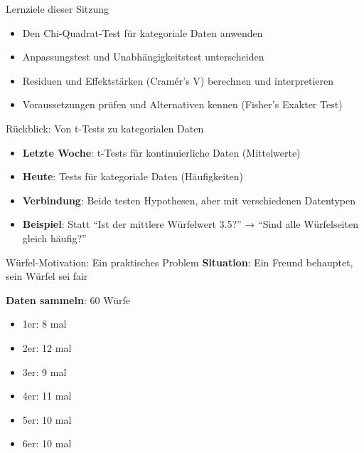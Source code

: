 \documentclass[
  ignorenonframetext,
]{beamer}
\providecommand{\tightlist}{%
  \setlength{\itemsep}{0pt}\setlength{\parskip}{0pt}}
\begin{document}
\begin{frame}{Lernziele dieser Sitzung}
\protect{}\label{lernziele-dieser-sitzung-6}
\begin{itemize}
\tightlist
\item
  Den Chi-Quadrat-Test für kategoriale Daten anwenden
\item
  Anpassungstest und Unabhängigkeitstest unterscheiden
\item
  Residuen und Effektstärken (Cramér's V) berechnen und interpretieren
\item
  Voraussetzungen prüfen und Alternativen kennen (Fisher's Exakter Test)
\end{itemize}
\end{frame}

\begin{frame}{Rückblick: Von t-Tests zu kategorialen Daten}
\protect{}\label{ruxfcckblick-von-t-tests-zu-kategorialen-daten}
\begin{itemize}
\tightlist
\item
  \textbf{Letzte Woche}: t-Tests für kontinuierliche Daten (Mittelwerte)
\item
  \textbf{Heute}: Tests für kategoriale Daten (Häufigkeiten)
\item
  \textbf{Verbindung}: Beide testen Hypothesen, aber mit verschiedenen
  Datentypen
\item
  \textbf{Beispiel}: Statt ``Ist der mittlere Würfelwert 3.5?'' → ``Sind
  alle Würfelseiten gleich häufig?''
\end{itemize}
\end{frame}

\begin{frame}{Würfel-Motivation: Ein praktisches Problem}
\protect{}\label{wuxfcrfel-motivation-ein-praktisches-problem}
\textbf{Situation}: Ein Freund behauptet, sein Würfel sei fair

\textbf{Daten sammeln}: 60 Würfe

\begin{itemize}
\tightlist
\item
  1er: 8 mal
\item
  2er: 12 mal
\item
  3er: 9 mal
\item
  4er: 11 mal
\item
  5er: 10 mal
\item
  6er: 10 mal
\end{itemize}
\end{frame}
\end{document}
